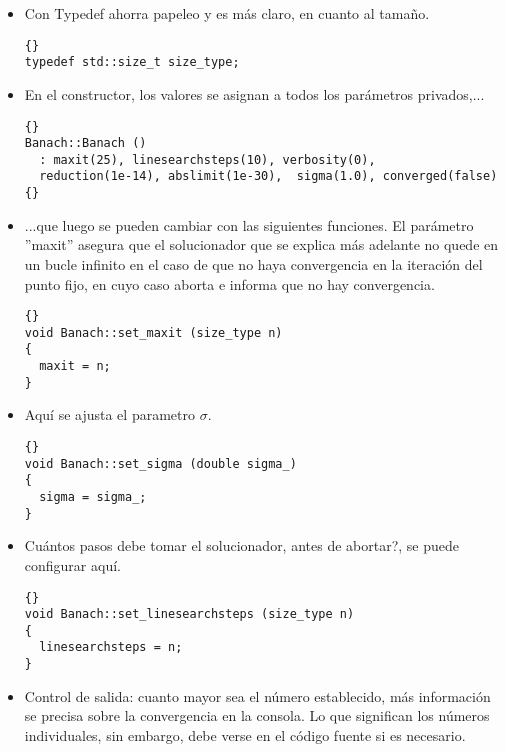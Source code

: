 \begin{itemize}
\item Con Typedef ahorra papeleo y es más claro, en cuanto al tamaño.

  {\footnotesize{\begin{lstlisting}{}
typedef std::size_t size_type;
\end{lstlisting}}}

\item En el constructor, los valores se asignan a todos los parámetros privados,...

{\footnotesize{\begin{lstlisting}{}
Banach::Banach ()
  : maxit(25), linesearchsteps(10), verbosity(0),
  reduction(1e-14), abslimit(1e-30),  sigma(1.0), converged(false)
{}
\end{lstlisting}}}

\item ...que luego se pueden cambiar con las siguientes funciones.  El parámetro ''maxit''  asegura que el solucionador que se explica más adelante no quede en un bucle infinito en el caso de que no haya convergencia en la iteración del punto fijo, en cuyo caso aborta e informa que no hay convergencia.

 {\footnotesize{\begin{lstlisting}{}
void Banach::set_maxit (size_type n)
{
  maxit = n;
}
\end{lstlisting}}}

\item Aquí se ajusta el parametro $\sigma$.

  {\footnotesize{\begin{lstlisting}{}
void Banach::set_sigma (double sigma_)
{
  sigma = sigma_;
}
\end{lstlisting}}}

\item Cuántos pasos debe tomar el solucionador, antes de abortar?, se puede configurar aquí.

{\footnotesize{\begin{lstlisting}{}
void Banach::set_linesearchsteps (size_type n)
{
  linesearchsteps = n;
}
\end{lstlisting}}}

\item Control de salida: cuanto mayor sea el número establecido, más información se precisa sobre la convergencia en la consola. Lo que significan los números individuales, sin embargo, debe verse en el código fuente si es necesario.


\end{itemize}
